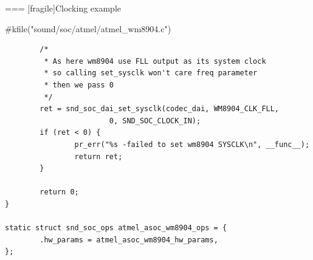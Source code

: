 === [fragile]{Clocking example}
  \begin{block}{#kfile("sound/soc/atmel/atmel_wm8904.c")}
    \fontsize{9}{9}\selectfont
    \begin{verbatim}
        /*
         * As here wm8904 use FLL output as its system clock
         * so calling set_sysclk won't care freq parameter
         * then we pass 0
         */
        ret = snd_soc_dai_set_sysclk(codec_dai, WM8904_CLK_FLL,
                        0, SND_SOC_CLOCK_IN);
        if (ret < 0) {
                pr_err("%s -failed to set wm8904 SYSCLK\n", __func__);
                return ret;
        }

        return 0;
}

static struct snd_soc_ops atmel_asoc_wm8904_ops = {
        .hw_params = atmel_asoc_wm8904_hw_params,
};
    \end{verbatim}
  \end{block}

